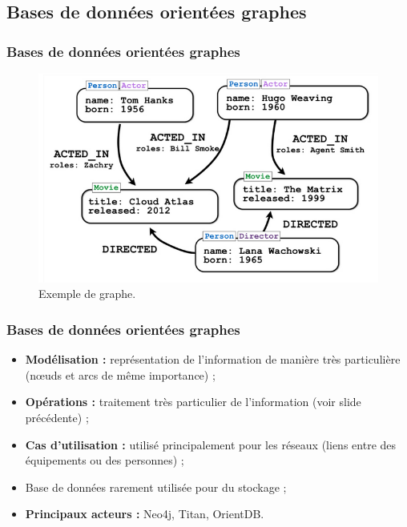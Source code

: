     \subsection{Bases de données orientées graphes}
    \begin{frame}
        \frametitle{Bases de données orientées graphes}

        \begin{figure}[htb]
            \includegraphics[width=1\textwidth]{images/graphe.png}
            \caption{Exemple de graphe.}
        \end{figure}
    \end{frame}

    \begin{frame}
        \frametitle{Bases de données orientées graphes}

        \begin{itemize}
            \item \textbf{Modélisation :} représentation de l'information de manière très particulière (nœuds et arcs de même importance) ;
            \item \textbf{Opérations :} traitement très particulier de l'information (voir slide précédente) ;
            \item \textbf{Cas d'utilisation :} utilisé principalement pour les réseaux (liens entre des équipements ou des personnes) ;
            \item Base de données rarement utilisée pour du stockage ;
            \item \textbf{Principaux acteurs :} Neo4j, Titan, OrientDB.
        \end{itemize}
    \end{frame}

